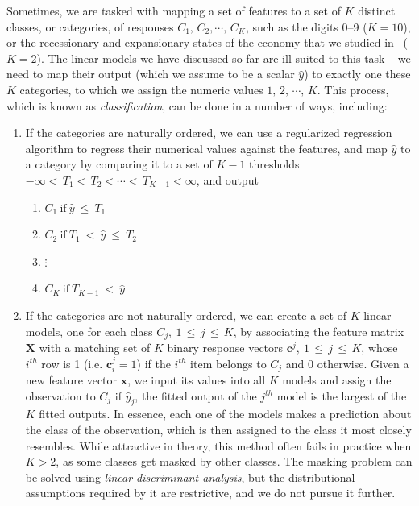 \documentclass[graybox,envcountchap,sectrefs]{svmono}\usepackage[]{graphicx}\usepackage[]{xcolor}
\begin{document}
\begin{appendices}
Sometimes, we are tasked with mapping a set of features to a set of
$K$ distinct classes, or categories, of responses $C_{1},\,C_{2},\cdots,\,C_{K}$,
such as the digits 0--9 ($K=10$), or the recessionary and expansionary
states of the economy that we studied in \ExpectedReturnChapter\ 
($K=2$). The linear models we have discussed so far are ill suited
to this task -- we need to map their output (which we assume to be
a scalar $\hat{y}$) to exactly one these $K$ categories, to which
we assign the numeric values $1,\,2,\,\cdots,\,K$. This process,
which is known as \emph{classification}, can be done in a number of
ways, including:
\begin{enumerate}
\item If the categories are naturally ordered, we can use a regularized
regression algorithm to regress their numerical values against the
features, and map $\hat{y}$ to a category by comparing it to a set
of $K-1$ thresholds $-\infty<\,T_{1}<\,T_{2}<\cdots<\,T_{K-1}<\infty$,
and output 
\begin{enumerate}
\item $C_{1}\ \mathrm{if}\ \hat{y}\ \leqslant\ T_{1}$ 
\item $C_{2}\ \mathrm{if}\ T_{1}\ <\ \hat{y}\ \leqslant\ T_{2}$
\item $\vdots$
\item $C_{K}\ \mathrm{if}\ T_{K-1}\ <\ \hat{y}$
\end{enumerate}
\item If the categories are not naturally ordered, we can create a set of
$K$ linear models, one for each class $C_{j},\ 1\,\leqslant\,j\,\leqslant\,K$,
by associating the feature matrix $\mathbf{X}$ with a matching set
of $K$ binary response vectors $\mathbf{c}^{j},\ 1\,\leqslant\,j\,\leqslant\,K$,
whose $i^{th}$ row is 1 (i.e. $\mathbf{c}_{i}^{j}=1$) if the $i^{th}$
item belongs to $C_{j}$ and 0 otherwise. Given a new feature vector
$\mathbf{x}$, we input its values into all $K$ models and assign
the observation to $C_{j}$ if $\hat{y}_{j}$, the fitted output of
the $j^{th}$ model is the largest of the $K$ fitted outputs. In
essence, each one of the models makes a prediction about the class
of the observation, which is then assigned to the class it most closely
resembles. While attractive in theory, this method often fails in
practice when $K>2$, as some classes get masked by other classes.
The masking problem can be solved using \emph{linear discriminant
analysis}, but the distributional assumptions required by it are restrictive,
and we do not pursue it further.

\end{enumerate}
\end{appendices}
\end{document}
